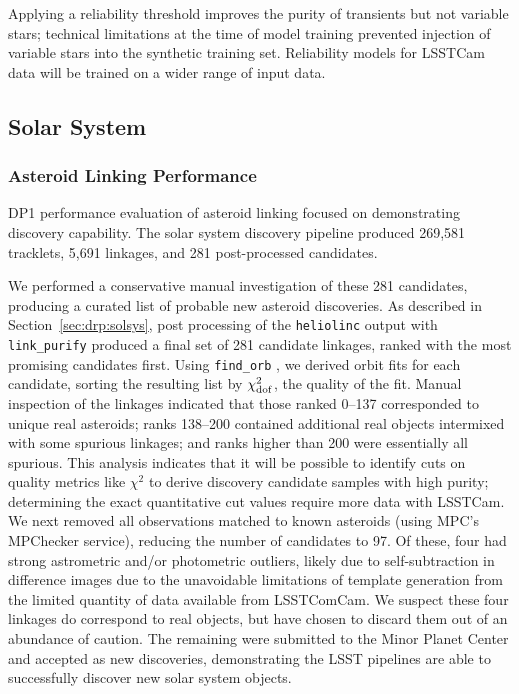 Applying a reliability threshold improves the purity of transients but not variable stars; technical limitations at the time of model training prevented injection of variable stars into the synthetic training set.
Reliability models for \gls{LSSTCam} data will be trained on a wider range of input data.

\subsection{Solar System}
\label{sec:performance:solsys}

\subsubsection{Asteroid Linking Performance}

\gls{DP1} performance evaluation of asteroid linking focused on demonstrating discovery capability.
The solar system discovery \gls{pipeline} produced 269,581 tracklets, 5,691 linkages, and 281 post-processed candidates.

We performed a conservative manual investigation of these 281 candidates, producing a curated list of \nnewasteroiddiscoveries probable new asteroid discoveries.
As described in Section~\ref{sec:drp:solsys}, post processing of the {\tt heliolinc} output with {\tt link\_purify} produced a final set of 281 candidate linkages, ranked with the most promising candidates first.
Using {\tt find\_orb} \citep{findorb}, we derived orbit fits for each candidate, sorting the resulting list by $\chi_{\rm dof}^2$, the quality of the fit.
Manual inspection of the linkages indicated that those ranked 0--137 corresponded to unique real asteroids; ranks 138--200 contained additional real objects intermixed with some spurious linkages; and ranks higher than 200 were essentially all spurious.
This analysis indicates that it will be possible to identify cuts on quality metrics like $\chi^2$ to derive discovery candidate samples with high purity; determining the exact quantitative cut values require more data with \gls{LSSTCam}.
We next removed all observations matched to known asteroids (using \gls{MPC}'s MPChecker service), reducing the number of candidates to 97.
Of these, four had strong astrometric and/or photometric outliers, likely due to self-subtraction in difference images due to the unavoidable limitations of template generation from the limited quantity of data available from  \gls{LSSTComCam}.
We suspect these four linkages do correspond to real objects, but have chosen to discard them out of an abundance of caution.
The remaining \nnewasteroiddiscoveries were submitted to the Minor Planet Center and accepted as new discoveries, demonstrating the \gls{LSST} pipelines are able to successfully discover new solar system objects.

